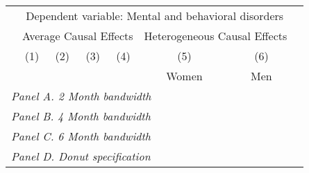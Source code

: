 {\def\sym#1{\ifmmode^{#1}\else\(^{#1}\)\fi}                 \begin{tabular}{l*{7}{c}} \toprule                 & \multicolumn{6}{c}{Dependent variable: Mental and behavioral disorders} \\ \cmidrule(lr){2-6}
            &\multicolumn{4}{c}{Average Causal Effects}         &\multicolumn{2}{c}{Heterogeneous Causal Effects}\\\cmidrule(lr){2-5}\cmidrule(lr){6-7}
            &\multicolumn{1}{c}{(1)}&\multicolumn{1}{c}{(2)}&\multicolumn{1}{c}{(3)}&\multicolumn{1}{c}{(4)}&\multicolumn{1}{c}{(5)}&\multicolumn{1}{c}{(6)}\\
            &\multicolumn{1}{c}{}&\multicolumn{1}{c}{}&\multicolumn{1}{c}{}&\multicolumn{1}{c}{}&\multicolumn{1}{c}{Women}&\multicolumn{1}{c}{Men}\\
\midrule
                 \multicolumn{7}{l}{\emph{Panel A. 2 Month bandwidth}} \\                                                                    \midrule\multicolumn{7}{l}{\emph{Panel B. 4 Month bandwidth}} \\                                                                    \midrule\multicolumn{7}{l}{\emph{Panel C. 6 Month bandwidth}} \\                                                                    \midrule\multicolumn{7}{l}{\emph{Panel D. Donut specification}} \\                                                                    \midrule                  
\bottomrule
\end{tabular}
}
